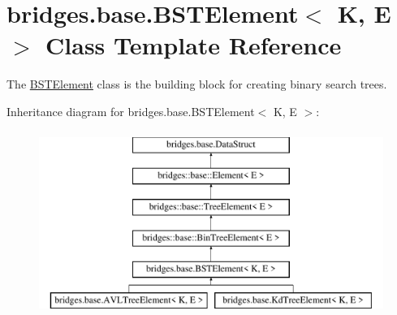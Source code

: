 \hypertarget{classbridges_1_1base_1_1_b_s_t_element}{}\section{bridges.\+base.\+B\+S\+T\+Element$<$ K, E $>$ Class Template Reference}
\label{classbridges_1_1base_1_1_b_s_t_element}


The \mbox{\hyperlink{classbridges_1_1base_1_1_b_s_t_element}{B\+S\+T\+Element}} class is the building block for creating binary search trees.  


Inheritance diagram for bridges.\+base.\+B\+S\+T\+Element$<$ K, E $>$\+:\begin{figure}[H]
\begin{center}
\leavevmode
\includegraphics[height=6.000000cm]{classbridges_1_1base_1_1_b_s_t_element}
\end{center}
\end{figure}
